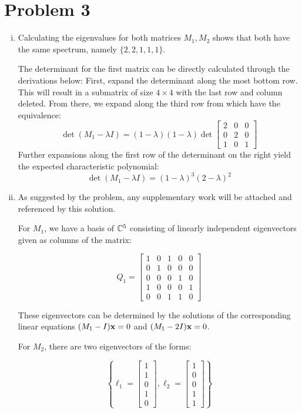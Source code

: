 \documentclass[12pt]{article}%
\begin{document}
\section*{Problem 3}
\begin{enumerate}[i.]
  \item Calculating the eigenvalues for both matrices $M_1, M_2$ shows that both have the same spectrum, namely $\{2,2,1,1,1\}$.

 The determinant for the first matrix can be directly calculated through the derivations below:
 First, expand the determinant along the most bottom row. This will result in a submatrix of size $4 \times 4$ with the last row and column deleted. From there, we expand along the third row from which have the equivalence:
 \[ \det (M_1 - \lambda I) = (1 - \lambda)(1-\lambda) \det \begin{bmatrix}
    2 & 0 & 0 \\
    0 & 2 & 0 \\
    1 & 0 & 1
 \end{bmatrix} \]
 Further expansions along the first row of the determinant on the right yield the expected characteristic polynomial:
 \[\det (M_1 - \lambda I)= (1 - \lambda)^3(2-\lambda)^2 \]
%
  \item
  As suggested by the problem, any supplementary work will be attached and referenced by this solution.

  For $M_1$, we have a basis of ${\mathbb{C}}^5$ consisting of linearly independent eigenvectors given as columns of the matrix:

  \[ Q_1 = \begin{bmatrix}
      1 & 0 & 1 & 0 & 0 \\
      0 & 1 & 0 & 0 & 0 \\
      0 & 0 & 0 & 1 & 0 \\
      1 & 0 & 0 & 0 & 1 \\
      0 & 0 & 1 & 1 & 0
  \end{bmatrix} \]

  These eigenvectors can be determined by the solutions of the corresponding linear equations $(M_1 - I){\bf x} = 0$ and $(M_1 - 2I){\bf x} = 0$.

  For $M_2$, there are two eigenvectors of the forms:

\[\left\{  \ell_{1} = \begin{bmatrix}
  1 \\ 1 \\ 0 \\ 1 \\ 0
\end{bmatrix}, \ell_{2} = \begin{bmatrix}
1 \\ 0 \\ 0 \\ 1 \\ 1
\end{bmatrix} \right\} \]


\end{enumerate}
\end{document}
